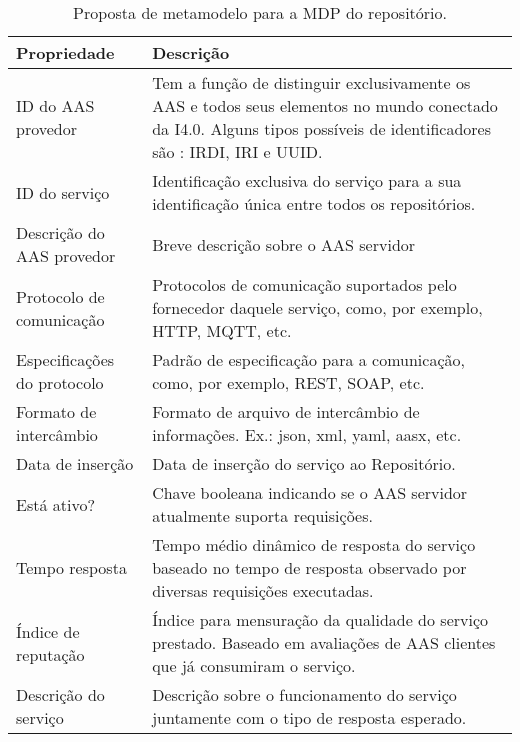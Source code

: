 	\begin{table}[htb]
		\centering
		\caption{Proposta de metamodelo para a MDP do repositório.}
		\label{tab:mdp-repositorio}
		\begin{tabular}{p{3cm}p{12cm}}
			\hline
			\textbf{Propriedade}
			& \textbf{Descrição} \\ 
			
			\hline
			ID do AAS provedor
			& Tem a função de distinguir exclusivamente os AAS e todos seus elementos \cite{adolphs2016structure} no mundo conectado da I4.0. Alguns tipos possíveis de identificadores são \cite{bader2019aas}: IRDI, IRI e UUID. \\
			
			\hline
			ID do serviço
			& Identificação exclusiva do serviço para a sua identificação única entre todos os repositórios. \\
			
			\hline
			Descrição do AAS provedor
			& Breve descrição sobre o AAS servidor \\
			
			\hline
			Protocolo de comunicação
			& Protocolos de comunicação suportados pelo fornecedor daquele serviço, como, por exemplo, HTTP, MQTT, etc.  \\
			
			\hline
			Especificações do protocolo
			& Padrão de especificação para a comunicação, como, por exemplo, REST, SOAP, etc. \\
			
			\hline
			Formato de intercâmbio
			& Formato de arquivo de intercâmbio de informações. Ex.: json, xml, yaml, aasx, etc.  \\
			
			\hline
			Data de inserção
			& Data de inserção do serviço ao Repositório. \\
			
			\hline
			Está ativo?
			& Chave booleana indicando se o AAS servidor atualmente suporta requisições.  \\
			
			\hline
			Tempo resposta
			& Tempo médio dinâmico de resposta do serviço baseado no tempo de resposta observado por diversas requisições executadas. \\
			
			\hline
			Índice de reputação
			& Índice para mensuração da qualidade do serviço prestado. Baseado em avaliações de AAS clientes que já consumiram o serviço.  \\
			
			\hline
			Descrição do serviço
			& Descrição sobre o funcionamento do serviço juntamente com o tipo de resposta esperado.  \\			
			\hline
		\end{tabular}
	\end{table}
	
